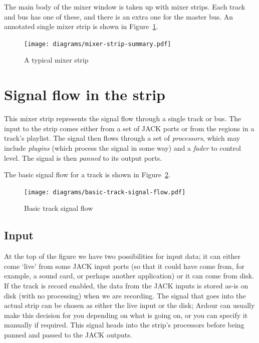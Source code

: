 \documentclass[10pt,a4paper]{book}
\begin{document}
{The main body of the mixer window is taken up with mixer strips.  Each
track and bus has one of these, and there is an extra one for the
master bus.  An annotated single mixer strip is shown in
Figure~\ref{fig:mixer-strip-summary}.

\begin{figure}[ht]
\begin{center}
\texttt{[image: diagrams/mixer-strip-summary.pdf]}
\end{center}
\caption{A typical mixer strip}
\label{fig:mixer-strip-summary}
\end{figure}

\section{Signal flow in the strip}

This mixer strip represents the signal flow through a single track or
bus.  The input to the strip comes either from a set of JACK ports or
from the regions in a track's playlist.  The signal then flows through
a set of \emph{processors}, which may include \emph{plugins} (which
process the signal in some way) and a \emph{fader} to control level.
The signal is then \emph{panned} to its output ports.

The basic signal flow for a track is shown in
Figure~\ref{fig:basic-track-signal-flow}.

\begin{figure}[ht]
\begin{center}
\texttt{[image: diagrams/basic-track-signal-flow.pdf]}
\end{center}
\caption{Basic track signal flow}
\label{fig:basic-track-signal-flow}
\end{figure}

\subsection{Input}

At the top of the figure we have two possibilities for input data; it
can either come `live' from some JACK input ports (so that it could
have come from, for example, a sound card, or perhaps another
application) or it can come from disk.  If the track is record
enabled, the data from the JACK inputs is stored as-is on disk (with
no processing) when we are recording.  The signal that goes into the
actual strip can be chosen as either the live input or the disk;
Ardour can usually make this decision for you depending on what is
going on, or you can specify it manually if required.  This signal
heads into the strip's processors before being panned and passed to
the JACK outputs.

}
\end{document}
